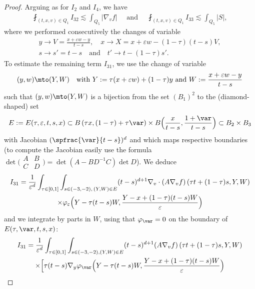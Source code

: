 \begin{proof}
Arguing as for $I_2$ and $I_4$, we have
\begin{align}
\label{estim I323}
\fint_{(t,x,v) \in Q_1} I_{32} \lesssim \int_{Q_5} \left|
\nabla_v f\right| \quad \text{ and } \quad
\fint_{(t,x,v) \in Q_1} I_{33} \lesssim \int_{Q_5} |S|,
\end{align}
where we performed consecutively the changes of variable
\begin{gather*}
y\to V=\frac{x+\varepsilon w-y}{t-s},\quad
x\to X= x+\varepsilon w -(1-\tau)(t-s)V,\\
s\to s'=t-s\quad \text{and}\quad t'\to t-(1-\tau)s'.
\end{gather*}
To estimate the remaining term $I_{31}$, we use the change of
variable
\begin{equation}
\label{eq:change-variables}
(y,w) \mto (Y,W) \quad \text{with }
Y:=\tau (x+\varepsilon w)+(1-\tau)y \text{ and } W:=\frac{x+\varepsilon w -y}{t-s}
\end{equation}
such that $(y,w)\mto (Y,W)$ is a bijection from the set
$(B_1)^2$ to the (diamond-shaped) set
\begin{equation*}
E:=E(\tau,\varepsilon,t,s,x) \subset B\left(\tau x, (1-\tau)
+ \tau \var\right)
\times B\Bigl(\frac{x}{t-s},\frac{1+\var}{t-s}\Bigr)
\subset B_2 \times B_3
\end{equation*}
with Jacobian $(\spfrac{\var}{t-s})^d$ and which maps
respective boundaries (to compute the Jacobian easily use the
formula
$\det \bigl( \begin{smallmatrix} A & B \\ C & D \end{smallmatrix}\bigr) =
\det(A - B D^{-1} C) \det D$). We deduce
\begin{multline*}
I_{31} = \frac{1}{\varepsilon^d} \int_{\tau\in
[0,1]}\int_{s\in (-3,-2), \, (Y,W)\in E}
(t-s)^{d+1}\nabla_v\cdot (A
\nabla_v f)\left(\tau
t+(1-\tau)s,Y,W\right)\\
\times \varphi_{\varepsilon} \Bigl(Y-\tau
(t-s)W,\frac{Y-x+(1-\tau)(t-s)W}{\varepsilon} \Bigr)
\end{multline*}
and we integrate by parts in $W$, using that $\varphi_\var=0$
on the boundary of $E(\tau,\var,t,s,x)$:
\begin{multline*}
I_{31}=
\frac{1}{\varepsilon^d}\int_{\tau \in
[0,1]}\int_{s\in (-3,-2), (Y,W)\in E} (t-s)^{d+1}(A \nabla_v
f)\left(\tau t+(1-\tau)s,Y,W\right) \\
\times \Bigl[\tau (t-s)\nabla_y\varphi_\var
\Bigl(Y - \tau (t-s)W,\frac{Y-x+(1-\tau)(t-s)W}{\varepsilon}
\Bigr)\\

\end{multline*}
\end{proof}
